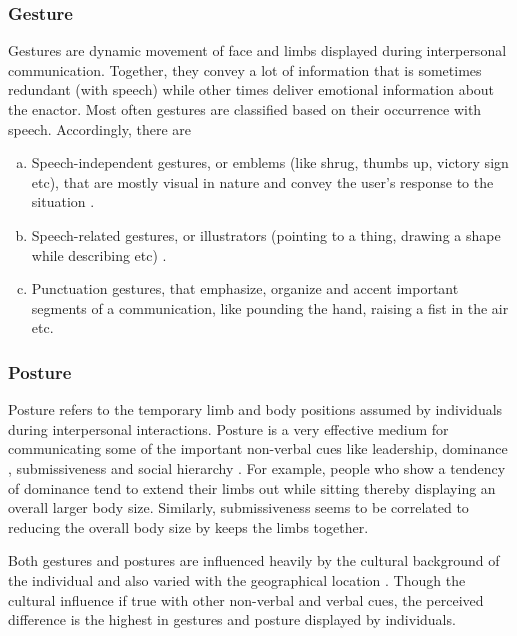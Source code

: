 \documentclass[oneside,11pt]{memoir}
\begin{document}
\subsubsection{Gesture}
Gestures are dynamic movement of face and limbs displayed during interpersonal communication. Together, they convey a lot of information that is sometimes redundant (with speech) while other times deliver emotional information about the enactor. Most often gestures are classified based on their occurrence with speech. Accordingly, there are
\begin{enumerate} [(a)]
\item Speech-independent gestures, or emblems (like shrug, thumbs up, victory sign etc), that are mostly visual in nature and convey the user's response to the situation \cite{ekman_nonverbal_1976} \cite{wagner_field_2003}.
\item Speech-related gestures, or illustrators (pointing to a thing, drawing a shape while describing etc) \cite{efron_gesture_1972}.
\item Punctuation gestures, that emphasize, organize and accent important segments of a communication, like pounding the hand, raising a fist in the air etc.
    \end{enumerate}

\subsubsection{Posture}
Posture refers to the temporary limb and body positions assumed by individuals during interpersonal interactions.  Posture is a very effective medium for communicating some of the important non-verbal cues like leadership, dominance \cite{weisfeld_erectness_1982}, submissiveness and social hierarchy \cite{grant_comparison_1963}. For example, people who show a tendency of dominance tend to extend their limbs out while sitting thereby displaying an overall larger body size. Similarly, submissiveness seems to be correlated to reducing the overall body size by keeps the limbs together.

Both gestures and postures are influenced heavily by the cultural background of the individual and also varied with the geographical location \cite{kleinsmith_cross-cultural_2006}. Though the cultural influence if true with other non-verbal and verbal cues, the perceived difference is the highest in gestures and posture displayed by individuals.
\end{document}
